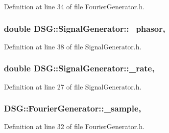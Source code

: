 Definition at line 34 of file Fourier\+Generator.\+h.

\hypertarget{classDSG_1_1SignalGenerator_ac2271b582bf699275f077ecb642a8cd9}{
\subsubsection[{\+\_\+phasor}]{\setlength{\rightskip}{0pt plus 5cm}double D\+S\+G\+::\+Signal\+Generator\+::\+\_\+phasor\hspace{0.3cm}{\ttfamily [protected]}, {\ttfamily [inherited]}}}\label{classDSG_1_1SignalGenerator_ac2271b582bf699275f077ecb642a8cd9}


Definition at line 38 of file Signal\+Generator.\+h.

\hypertarget{classDSG_1_1SignalGenerator_aa10f6c85d9adee901139ea7fb346f39d}{
\subsubsection[{\+\_\+rate}]{\setlength{\rightskip}{0pt plus 5cm}double D\+S\+G\+::\+Signal\+Generator\+::\+\_\+rate\hspace{0.3cm}{\ttfamily [protected]}, {\ttfamily [inherited]}}}\label{classDSG_1_1SignalGenerator_aa10f6c85d9adee901139ea7fb346f39d}


Definition at line 27 of file Signal\+Generator.\+h.

\hypertarget{classDSG_1_1FourierGenerator_ab96bed1cd59c42e82a689036e5c62bef}{
\subsubsection[{\+\_\+sample}]{ D\+S\+G\+::\+Fourier\+Generator\+::\+\_\+sample\hspace{0.3cm}{\ttfamily [protected]}, {\ttfamily [inherited]}}}\label{classDSG_1_1FourierGenerator_ab96bed1cd59c42e82a689036e5c62bef}


Definition at line 32 of file Fourier\+Generator.\+h.

